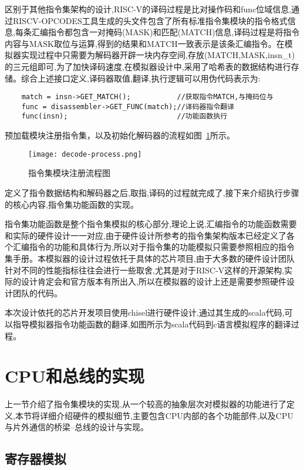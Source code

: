 区别于其他指令集架构的设计,RISC-V的译码过程是比对操作码和func位域信息,通过RISCV-OPCODES工具生成的头文件包含了所有标准指令集模块的指令格式信息,每条汇编指令都包含一对掩码(MASK)和匹配(MATCH)信息,译码过程是将指令内容与MASK取位与运算,得到的结果和MATCH一致表示是该条汇编指令。在模拟器实现过程中只需要为解码器开辟一块内存空间,存放(MATCH,MASK,insn\_t)的三元组即可,为了加快译码速度,在模拟器设计中,采用了哈希表的数据结构进行存储。综合上述接口定义,译码器取值,翻译,执行逻辑可以用伪代码表示为:
\begin{lstlisting}
    match = insn->GET_MATCH();           //获取指令MATCH,与掩码位与
    func = disassembler->GET_FUNC(match);//译码器指令翻译
    func(insn);                          //功能函数执行
\end{lstlisting}
预加载模块注册指令集，以及初始化解码器的流程如图~\ref{fig:decode-process}所示。
\begin{figure}[H]
  \centering
  \texttt{[image: decode-process.png]}
  \caption{指令集模块注册流程图}
  \label{fig:decode-process}
\end{figure}


定义了指令数据结构和解码器之后,取指,译码的过程就完成了,接下来介绍执行步骤的核心内容,指令集功能函数的实现。


指令集功能函数是整个指令集模拟的核心部分,理论上说,汇编指令的功能函数需要和实际的硬件设计一一对应,由于硬件设计所参考的指令集架构版本已经定义了各个汇编指令的功能和具体行为,所以对于指令集的功能模拟只需要参照相应的指令集手册。本模拟器的设计过程依托于具体的芯片项目,由于大多数的硬件设计团队针对不同的性能指标往往会进行一些取舍,尤其是对于RISC-V这样的开源架构,实际的设计肯定会和官方版本有所出入,所以在模拟器的设计上还是需要参照硬件设计团队的代码。


本次设计依托的芯片开发项目使用chisel进行硬件设计,通过其生成的scala代码,可以指导模拟器指令功能函数的翻译,如图所示为scala代码到c语言模拟程序的翻译过程。


\section{CPU和总线的实现}

上一节介绍了指令集模块的实现,从一个较高的抽象层次对模拟器的功能进行了定义,本节将详细介绍硬件的模拟细节,主要包含CPU内部的各个功能部件,以及CPU与片外通信的桥梁--总线的设计与实现。


\subsection{寄存器模拟}

